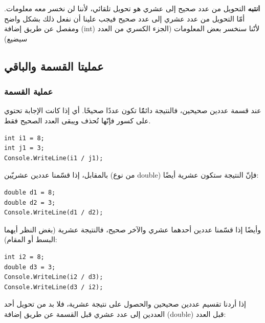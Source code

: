 \documentclass[14pt]{extarticle}
\begin{document}
\textbf{انتبه} التحويل من عدد صحيح إلى عشري هو تحويل تلقائي، لأننا لن نخسر معه معلومات.
أمّا التحويل من عدد عشري إلى عدد صحيح فيجب علينا أن نفعل ذلك بشكل واضح ومفصل عن طريق إضافة \textenglish{(int)} لأنّنا سنخسر بعض المعلومات (الجزء الكسري من العدد سيضيع)

\subsection{عمليتا القسمة والباقي}

\subsubsection*{عملية القسمة}

عند قسمة عددين صحيحين، فالنتيجة دائمًُا تكون عددًا صحيحًا. أي إذا كانت الإجابة تحتوي على كسور فإنّها تُحذف ويبقى العدد الصحيح فقط.

\begin{boxExample}
\begin{english}
\begin{verbatim}
int i1 = 8;
int j1 = 3;
Console.WriteLine(i1 / j1);
\end{verbatim}
\end{english}
\end{boxExample}

بالمقابل، إذا قسّمنا عددين عشريّين (من نوع \textenglish{double}) فإنّ النتيجة ستكون عشرية أيضًا:

\begin{boxExample}
\begin{english}
\begin{verbatim}
double d1 = 8;
double d2 = 3;
Console.WriteLine(d1 / d2);
\end{verbatim}
\end{english}
\end{boxExample}

وأيضًا إذا قسّمنا عددين أحدهما عشري والآخر صحيح، فالنتيجة عشرية (بغض النظر أيهما البسط أو المقام):

\begin{boxExample}
\begin{english}
\begin{verbatim}
int i2 = 8;
double d3 = 3;
Console.WriteLine(i2 / d3);
Console.WriteLine(d3 / i2);
\end{verbatim}
\end{english}
\end{boxExample}

إذا أردنا تقسيم عددين صحيحين والحصول على نتيجة عشرية، فلا بد من تحويل أحد العددين إلى عدد عشري قبل القسمة عن طريق إضافة \textenglish{(double)} قبل العدد:
\end{document}
